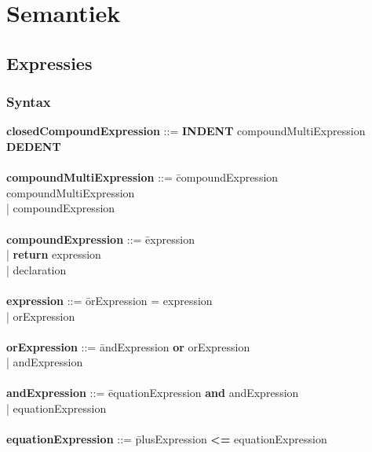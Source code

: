 \chapter{Semantiek}

\section{Expressies}
    \subsection{Syntax}
        \begin{tabbing} 
            {\bf closedCompoundExpression}    ::= \textbf{INDENT} compoundMultiExpression \textbf{DEDENT}\\
            \\ 
            {\bf compoundMultiExpression}     ::= \=compoundExpression compoundMultiExpression\\
                                                  \>| compoundExpression\\
            \\
            {\bf compoundExpression}          ::= \=expression\\
                                                  \>| \textbf{return} expression\\
                                                  \>| declaration\\
            \\ 
            {\bf expression}                  ::= \=orExpression = expression\\
                                                  \>| orExpression\\
            \\   
            {\bf orExpression}                ::= \=andExpression \textbf{or} orExpression\\
                                                  \>| andExpression\\
            \\   
            {\bf andExpression}               ::= \=equationExpression \textbf{and} andExpression\\
                                                  \>| equationExpression\\
            \\ 
            {\bf equationExpression}          ::= \=plusExpression \textbf{\textless{}=} equationExpression\\

\end{tabbing}

